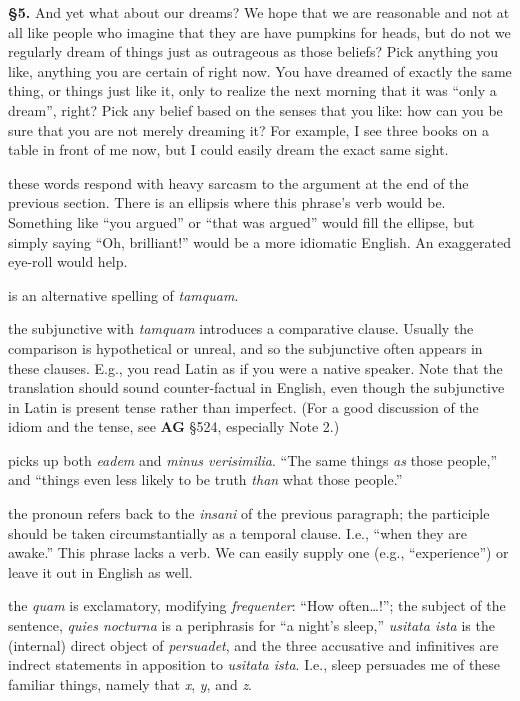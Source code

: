 \prenotes

\textbf{§5.} And yet what about our dreams? We hope that we are reasonable and not at all like people who imagine that they are have pumpkins for heads, but do not we regularly dream of things just as outrageous as those beliefs? Pick anything you like, anything you are certain of right now. You have dreamed of exactly the same thing, or things just like it, only to realize the next morning that it was ``only a dream'', right? Pick any belief based on the senses that you like: how can you be sure that you are not merely dreaming it? For example, I see three books on a table in front of me now, but I could easily dream the exact same sight.

 these words respond with heavy sarcasm to the argument at the end of the previous section. There is an ellipsis where this phrase's verb would be. Something like ``you argued'' or ``that was argued'' would fill the ellipse, but simply saying ``Oh, brilliant!'' would be a more idiomatic English. An exaggerated eye-roll would help.

 is an alternative spelling of \textit{tamquam}.

 the subjunctive with \textit{tamquam} introduces a comparative clause. Usually the comparison is hypothetical or unreal, and so the subjunctive often appears in these clauses. E.g., you read Latin as if you were a native speaker. Note that the translation should sound counter-factual in English, even though the subjunctive in Latin is present tense rather than imperfect. (For a good discussion of the idiom and the tense, see \textbf{AG} §524, especially Note 2.)

 picks up both \textit{eadem} and \textit{minus verisimilia}. ``The same things \textit{as} those people,'' and ``things even less likely to be truth \textit{than} what those people.''

 the pronoun refers back to the \textit{insani} of the previous paragraph; the participle should be taken circumstantially as a temporal clause. I.e., ``when they are awake.'' This phrase lacks a verb. We can easily supply one (e.g., ``experience'') or leave it out in English as well.

 the \textit{quam} is exclamatory, modifying \textit{frequenter}: ``How often\dots !''; the subject of the sentence, \textit{quies nocturna} is a periphrasis for ``a night's sleep,'' \textit{usitata ista} is the (internal) direct object of \textit{persuadet}, and the three accusative and infinitives are indrect statements in apposition to \textit{usitata ista}. I.e., sleep persuades me of these familiar things, namely that \textit{x}, \textit{y}, and \textit{z}.

